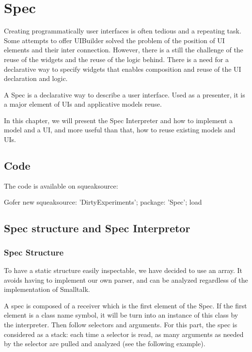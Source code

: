 \documentclass[a4paper,10pt,twoside]{book}
\begin{document}
\fi
\sloppy

\chapter{Spec}

Creating programmatically user interfaces is often tedious and a repeating task. Some attempts to offer UIBuilder solved the problem  of the position of UI elements and their inter connection. However, there is a still the challenge of the reuse of the widgets and the reuse of the logic behind. There is a need for a declarative way to specify widgets that enables composition and reuse of the UI declaration and logic. 

A Spec is a declarative way to describe a user interface. Used as a presenter, it is a major element of UIs and applicative models reuse.

In this chapter, we will present the Spec Interpreter and how to implement a model and a UI, and more useful than that, how to reuse existing models and UIs.

\section{Code}

The code is available on squeaksource:
\begin{code}{}
Gofer new
	squeaksource: 'DirtyExperiments';
	package: 'Spec';
	load
\end{code}

\section{Spec structure and Spec Interpretor}

\subsection{Spec Structure}

To have a static structure easily inspectable, we have decided to use an array. It avoids having to implement our own parser, and can be analyzed regardless of the implementation of Smalltalk.

A spec is composed of a receiver which is the first element of the Spec. If the first element is a class name symbol, it will be turn into an instance of this class by the interpreter. Then follow selectors and arguments. For this part, the spec is considered as a stack: each time a selector is read, as many arguments as needed by the selector are pulled and analyzed (see the following example).
\end{document}
